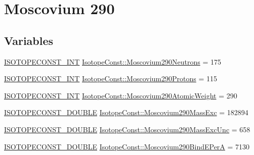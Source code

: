 \hypertarget{group___isotope_const-_moscovium-_mc290}{}\section{Moscovium 290}
\label{group___isotope_const-_moscovium-_mc290}
\subsection*{Variables}
\begin{DoxyCompactItemize}
\item 
\mbox{\hyperlink{group___isotope_const-_macros_ga5f18360b3e99483a35c32d789e62621c}{I\+S\+O\+T\+O\+P\+E\+C\+O\+N\+S\+T\+\_\+\+I\+NT}} \mbox{\hyperlink{group___isotope_const-_moscovium-_mc290_gacfda053c9f4d94ae08b13516afed642a}{Isotope\+Const\+::\+Moscovium290\+Neutrons}} = 175
\item 
\mbox{\hyperlink{group___isotope_const-_macros_ga5f18360b3e99483a35c32d789e62621c}{I\+S\+O\+T\+O\+P\+E\+C\+O\+N\+S\+T\+\_\+\+I\+NT}} \mbox{\hyperlink{group___isotope_const-_moscovium-_mc290_ga84b69ed8026d2142a5d7437b5df6a3a4}{Isotope\+Const\+::\+Moscovium290\+Protons}} = 115
\item 
\mbox{\hyperlink{group___isotope_const-_macros_ga5f18360b3e99483a35c32d789e62621c}{I\+S\+O\+T\+O\+P\+E\+C\+O\+N\+S\+T\+\_\+\+I\+NT}} \mbox{\hyperlink{group___isotope_const-_moscovium-_mc290_gaed5f0cf160634c8df63068cdae33da94}{Isotope\+Const\+::\+Moscovium290\+Atomic\+Weight}} = 290
\item 
\mbox{\hyperlink{group___isotope_const-_macros_ga8f45a7272ce02c0b4c65c44636ed719a}{I\+S\+O\+T\+O\+P\+E\+C\+O\+N\+S\+T\+\_\+\+D\+O\+U\+B\+LE}} \mbox{\hyperlink{group___isotope_const-_moscovium-_mc290_gaab15979c33dca3af1f2a2f9e42a851c4}{Isotope\+Const\+::\+Moscovium290\+Mass\+Exc}} = 182894
\item 
\mbox{\hyperlink{group___isotope_const-_macros_ga8f45a7272ce02c0b4c65c44636ed719a}{I\+S\+O\+T\+O\+P\+E\+C\+O\+N\+S\+T\+\_\+\+D\+O\+U\+B\+LE}} \mbox{\hyperlink{group___isotope_const-_moscovium-_mc290_ga3147f71acb660a5852fef9dce123e1fe}{Isotope\+Const\+::\+Moscovium290\+Mass\+Exc\+Unc}} = 658
\item 
\mbox{\hyperlink{group___isotope_const-_macros_ga8f45a7272ce02c0b4c65c44636ed719a}{I\+S\+O\+T\+O\+P\+E\+C\+O\+N\+S\+T\+\_\+\+D\+O\+U\+B\+LE}} \mbox{\hyperlink{group___isotope_const-_moscovium-_mc290_gac3821b7bd0e9fa1b192f98ff71570dba}{Isotope\+Const\+::\+Moscovium290\+Bind\+E\+PerA}} = 7130
\item 

\end{DoxyCompactItemize}
